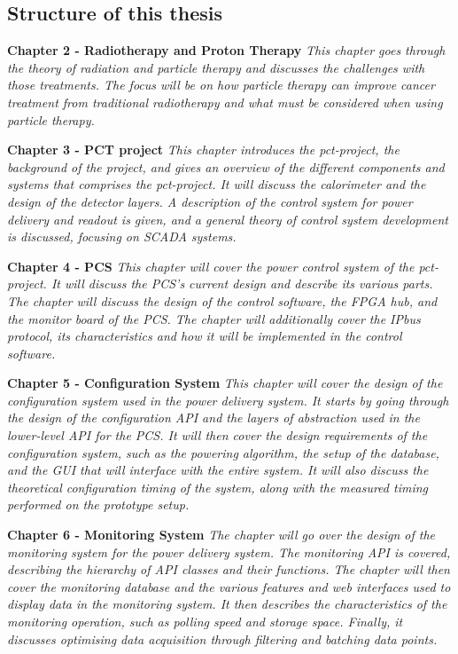 \documentclass[main.tex]{subfiles}
\begin{document}
\subsection{Structure of this thesis}

\textbf{Chapter 2 - Radiotherapy and Proton Therapy} \textit{This chapter goes through the theory of radiation and particle therapy and discusses the challenges with those treatments. The focus will be on how particle therapy can improve cancer treatment from traditional radiotherapy and what must be considered when using particle therapy.} 

\textbf{Chapter 3 - PCT project} \textit{This chapter introduces the \gls{pct}-project, the background of the project, and gives an overview of the different components and systems that comprises the \gls{pct}-project. It will discuss the calorimeter and the design of the detector layers. A description of the control system for power delivery and readout is given, and a general theory of control system development is discussed, focusing on SCADA systems.}

\textbf{Chapter 4 - PCS} \textit{This chapter will cover the power control system of the \gls{pct}-project. It will discuss the PCS's current design and describe its various parts. The chapter will discuss the design of the control software, the FPGA hub, and the monitor board of the PCS. The chapter will additionally cover the IPbus protocol, its characteristics and how it will be implemented in the control software.}

\textbf{Chapter 5 - Configuration System} \textit{This chapter will cover the design of the configuration system used in the power delivery system. It starts by going through the design of the configuration API and the layers of abstraction used in the lower-level API for the PCS. It will then cover the design requirements of the configuration system, such as the powering algorithm, the setup of the database, and the GUI that will interface with the entire system. It will also discuss the theoretical configuration timing of the system, along with the measured timing performed on the prototype setup.}

\textbf{Chapter 6 - Monitoring System} \textit{The chapter will go over the design of the monitoring system for the power delivery system. The monitoring API is covered, describing the hierarchy of API classes and their functions. The chapter will then cover the monitoring database and the various features and web interfaces used to display data in the monitoring system. It then describes the characteristics of the monitoring operation, such as polling speed and storage space. Finally, it discusses optimising data acquisition through filtering and batching data points.}
\end{document}
